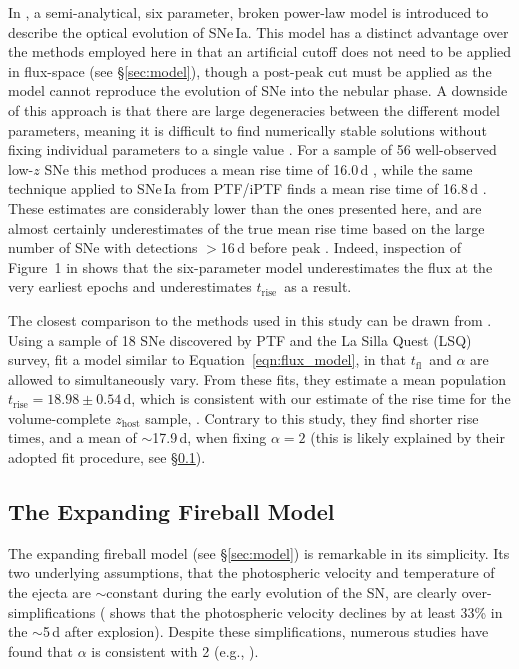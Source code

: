 \documentclass[twocolumn]{./aastex63}
\newcommand{\tfl}{$t_\mathrm{fl}$}
\newcommand{\trise}{$t_\mathrm{rise}$}
\begin{document}
In \citet{Zheng17}, a semi-analytical, six parameter, broken power-law model
is introduced to describe the optical evolution of SNe\,Ia. This model has a
distinct advantage over the methods employed here in that an artificial cutoff
does not need to be applied in flux-space (see \S\ref{sec:model}), though a
post-peak cut must be applied as the model cannot reproduce the evolution of
SNe into the nebular phase. A downside of this approach is that there are
large degeneracies between the different model parameters, meaning it is
difficult to find numerically stable solutions without fixing individual
parameters to a single value \citep{Zheng17a}. For a sample of 56
well-observed low-$z$ SNe this method produces a mean rise time of 16.0\,d
\citep{Zheng17a}, while the same technique applied to SNe\,Ia from PTF/iPTF
finds a mean rise time of 16.8\,d \citep{Papadogiannakis19}. These estimates
are considerably lower than the ones presented here, and are almost certainly
underestimates of the true mean rise time based on the large number of SNe
with detections $>$16\,d before peak \citep{Papadogiannakis19, Yao19}. Indeed,
inspection of Figure~1 in \citet{Zheng17a} shows that the six-parameter model
underestimates the flux at the very earliest epochs and underestimates \trise\
as a result.

The closest comparison to the methods used in this study can be drawn from
\citet{Firth15}. Using a sample of 18 SNe discovered by PTF and the La Silla
Quest (LSQ) survey, \citeauthor{Firth15} fit a model similar to
Equation~\ref{eqn:flux_model}, in that \tfl\ and $\alpha$ are allowed to
simultaneously vary. From these fits, they estimate a mean population \trise$
= 18.98 \pm 0.54$\,d, which is consistent with our estimate of the rise time
for the volume-complete $z_\mathrm{host}$ sample, \edit1{$\sim$18.9\,d}.
Contrary to this study, they find shorter rise times, and a mean of
$\sim$17.9\,d, when fixing $\alpha = 2$ (this is likely explained by their
adopted fit procedure, see \S\ref{sec:fireball_discussion}).

\subsection{The Expanding Fireball Model}\label{sec:fireball_discussion}

The expanding fireball model (see \S\ref{sec:model}) is remarkable in its
simplicity. Its two underlying assumptions, that the photospheric velocity and
temperature of the ejecta are $\sim$constant during the early evolution of the
SN, are clearly over-simplifications (\citealt{Parrent12} shows that the
photospheric velocity declines by at least 33\% in the $\sim$5\,d after
explosion). Despite these simplifications, numerous studies have found that
$\alpha$ is consistent with 2 (e.g.,
\citealt{Conley06,Hayden10,Ganeshalingam11,Gonzalez-Gaitan12,Zheng17a}).
\end{document}
